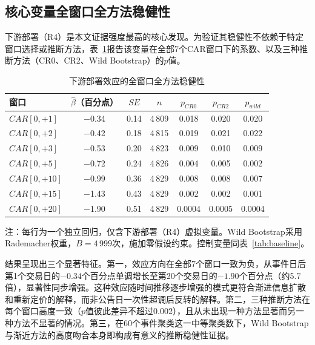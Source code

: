 \documentclass[11pt,fontset=fandol,a4paper]{ctexart}
\begin{document}
\subsection{核心变量全窗口全方法稳健性}

下游部署（R4）是本文证据强度最高的核心发现。为验证其稳健性不依赖于特定窗口选择或推断方法，表~\ref{tab:r2_robust}报告该变量在全部7个CAR窗口下的系数、以及三种推断方法（CR0、CR2、Wild Bootstrap）的$p$值。

\begin{table}[H]
\centering
\small
\begin{threeparttable}
\caption{下游部署效应的全窗口全方法稳健性}
\label{tab:r2_robust}
\begin{tabular}{lcccccc}
\toprule
窗口 & $\hat{\beta}$（百分点） & $SE$ & $n$ & $p_{CR0}$ & $p_{CR2}$ & $p_{wild}$ \\
\midrule
$CAR[0,+1]$ & $-$0.34 & 0.14 & 4\,809 & 0.018 & 0.020 & 0.020 \\
$CAR[0,+2]$ & $-$0.42 & 0.18 & 4\,815 & 0.019 & 0.021 & 0.022 \\
$CAR[0,+3]$ & $-$0.53 & 0.20 & 4\,823 & 0.009 & 0.010 & 0.009 \\
$CAR[0,+5]$ & $-$0.72 & 0.24 & 4\,826 & 0.004 & 0.005 & 0.002 \\
$CAR[0,+10]$ & $-$0.99 & 0.36 & 4\,829 & 0.008 & 0.008 & 0.007 \\
$CAR[0,+15]$ & $-$1.43 & 0.43 & 4\,829 & 0.002 & 0.002 & 0.001 \\
$CAR[0,+20]$ & $-$1.90 & 0.51 & 4\,829 & 0.0004 & 0.0005 & 0.0004 \\
\bottomrule
\end{tabular}
\begin{tablenotes}
\footnotesize
\item 注：每行为一个独立回归，仅含下游部署（R4）虚拟变量。Wild Bootstrap采用Rademacher权重，$B=4\,999$次，施加零假设约束。控制变量同表~\ref{tab:baseline}。
\end{tablenotes}
\end{threeparttable}
\end{table}

结果呈现出三个显著特征。第一，效应方向在全部7个窗口一致为负，从事件日后第1个交易日的$-0.34$个百分点单调增长至第20个交易日的$-1.90$个百分点（约5.7倍），显著性同步增强。这种效应随时间推移逐步增强的模式更符合渐进信息扩散和重新定价的解释，而非公告日一次性超调后反转的解释。第二，三种推断方法在每个窗口高度一致（$p$值彼此差异不超过0.002），且从未出现一种方法显著而另一种方法不显著的情况。第三，在60个事件聚类这一中等聚类数下，Wild Bootstrap与渐近方法的高度吻合本身即构成有意义的推断稳健性证据。
\end{document}
